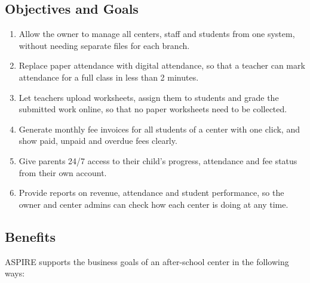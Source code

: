 \subsection{Objectives and Goals}
\begin{enumerate}[label=\textbf{G\arabic*.}]
  \item Allow the owner to manage all centers, staff and students from one
        system, without needing separate files for each branch.
  \item Replace paper attendance with digital attendance, so that a teacher can
        mark attendance for a full class in less than 2 minutes.
  \item Let teachers upload worksheets, assign them to students and grade the
        submitted work online, so that no paper worksheets need to be collected.
  \item Generate monthly fee invoices for all students of a center with one
        click, and show paid, unpaid and overdue fees clearly.
  \item Give parents 24/7 access to their child's progress, attendance and fee
        status from their own account.
  \item Provide reports on revenue, attendance and student performance, so the
        owner and center admins can check how each center is doing at any time.
\end{enumerate}

\subsection{Benefits}
ASPIRE supports the business goals of an after-school center in the following ways:


